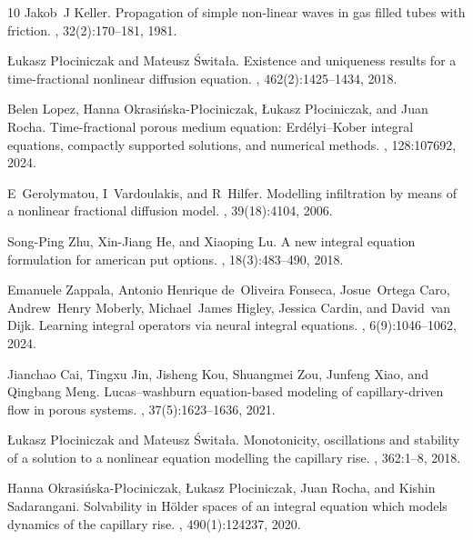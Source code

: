 \documentclass[12pt,a4paper]{article}
\begin{document}
\begin{thebibliography}{10}
	Jakob~J Keller.
	\newblock Propagation of simple non-linear waves in gas filled tubes with
	friction.
	,
	32(2):170--181, 1981.
	
	{\L}ukasz P{\l}ociniczak and Mateusz {\'S}wita{\l}a.
	\newblock Existence and uniqueness results for a time-fractional nonlinear
	diffusion equation.
	,
	462(2):1425--1434, 2018.
	
	Belen Lopez, Hanna Okrasi{\'n}ska-P{\l}ociniczak, {\L}ukasz P{\l}ociniczak, and
	Juan Rocha.
	\newblock Time-fractional porous medium equation: {E}rd{\'e}lyi--{K}ober
	integral equations, compactly supported solutions, and numerical methods.
	,
	128:107692, 2024.
	
	E~Gerolymatou, I~Vardoulakis, and R~Hilfer.
	\newblock Modelling infiltration by means of a nonlinear fractional diffusion
	model.
	, 39(18):4104, 2006.
	
	Song-Ping Zhu, Xin-Jiang He, and Xiaoping Lu.
	\newblock A new integral equation formulation for american put options.
	, 18(3):483--490, 2018.
	
	Emanuele Zappala, Antonio Henrique de~Oliveira Fonseca, Josue~Ortega Caro,
	Andrew~Henry Moberly, Michael~James Higley, Jessica Cardin, and David~van
	Dijk.
	\newblock Learning integral operators via neural integral equations.
	, 6(9):1046--1062, 2024.
	
	Jianchao Cai, Tingxu Jin, Jisheng Kou, Shuangmei Zou, Junfeng Xiao, and
	Qingbang Meng.
	\newblock Lucas--washburn equation-based modeling of capillary-driven flow in
	porous systems.
	, 37(5):1623--1636, 2021.
	
	{\L}ukasz P{\l}ociniczak and Mateusz {\'S}wita{\l}a.
	\newblock Monotonicity, oscillations and stability of a solution to a nonlinear
	equation modelling the capillary rise.
	, 362:1--8, 2018.
	
	Hanna Okrasi{\'n}ska-P{\l}ociniczak, {\L}ukasz P{\l}ociniczak, Juan Rocha, and
	Kishin Sadarangani.
	\newblock Solvability in {H}{\"o}lder spaces of an integral equation which
	models dynamics of the capillary rise.
	,
	490(1):124237, 2020.
	

\end{thebibliography}
\end{document}
